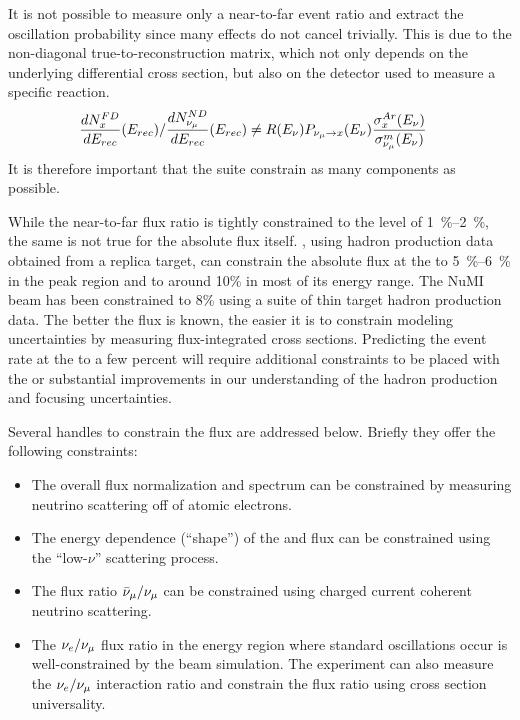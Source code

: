 It is not possible to measure only a near-to-far event ratio and extract the oscillation probability since many effects do not cancel trivially.  This is due to the non-diagonal true-to-reconstruction matrix, which not only depends on the underlying differential cross section, but also on the detector used to measure a specific reaction.
\begin{align}
\frac{dN^{FD}_{x}}{dE_{rec}}(E_{rec})/{\frac{dN^{ND}_{\nu_\mu}}{dE_{rec}}(E_{rec})} & \neq  R(E_\nu)P_{\nu_\mu\rightarrow x}(E_\nu)\frac{\sigma^{Ar}_x(E_\nu)}{\sigma^{m}_{\nu_\mu}(E_\nu)}
\end{align}
It is therefore important that the   suite constrain as many components as possible.


While the near-to-far flux ratio is tightly constrained to the level of \SIrange{1}{2}{\%}, the same is not true for the absolute flux itself. , using hadron production data obtained from a replica target, can constrain the absolute flux at the   to \SIrange{5}{6}{\%} in the peak region and to around 10\% in most of its energy range. The NuMI beam has been constrained to 8\% using a suite of thin target hadron production data. The better the  flux is known, the easier it is to constrain modeling uncertainties by measuring flux-integrated cross sections. Predicting the event rate at the   to a few percent will require additional constraints to be placed with the   or substantial improvements in our understanding of the hadron production and focusing uncertainties. 

Several handles to constrain the flux %
are addressed below. Briefly they offer the following constraints:

\begin{itemize}
    \item The overall flux normalization and spectrum can be constrained by measuring neutrino scattering off of atomic electrons.
    \item The energy dependence (``shape'') of the \numu and \anumu %
     flux can be constrained using the ``low-$\nu$'' scattering process.
    \item The flux ratio $\bar\nu_\mu/\nu_\mu$ can be constrained using charged current coherent neutrino scattering.
    \item The $\nu_e/\nu_\mu$ flux ratio in the energy region where standard oscillations occur is well-constrained by the beam simulation. The experiment can also measure the $\nu_e/\nu_\mu$ interaction ratio and constrain the flux ratio using cross section universality.
\end{itemize}





